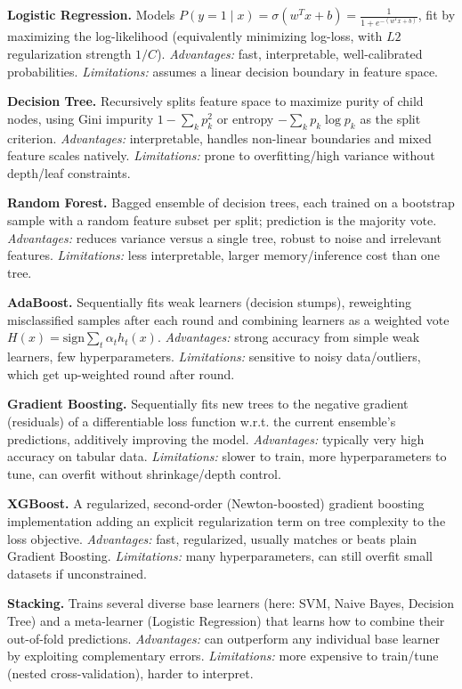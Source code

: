 \documentclass[12pt,a4paper]{article}
\begin{document}
\textbf{Logistic Regression.} Models \(P(y=1\mid x)=\sigma(w^Tx+b)=\tfrac{1}{1+e^{-(w^Tx+b)}}\), fit by
maximizing the log-likelihood (equivalently minimizing log-loss, with \(L2\) regularization
strength \(1/C\)). \emph{Advantages:} fast, interpretable, well-calibrated probabilities.
\emph{Limitations:} assumes a linear decision boundary in feature space.

\textbf{Decision Tree.} Recursively splits feature space to maximize purity of child nodes, using Gini
impurity \(1-\sum_k p_k^2\) or entropy \(-\sum_k p_k\log p_k\) as the split criterion.
\emph{Advantages:} interpretable, handles non-linear boundaries and mixed feature scales natively.
\emph{Limitations:} prone to overfitting/high variance without depth/leaf constraints.

\textbf{Random Forest.} Bagged ensemble of decision trees, each trained on a bootstrap sample with a
random feature subset per split; prediction is the majority vote. \emph{Advantages:} reduces variance
versus a single tree, robust to noise and irrelevant features. \emph{Limitations:} less interpretable,
larger memory/inference cost than one tree.

\textbf{AdaBoost.} Sequentially fits weak learners (decision stumps), reweighting misclassified samples
after each round and combining learners as a weighted vote \(H(x)=\text{sign}\sum_t \alpha_t
h_t(x)\). \emph{Advantages:} strong accuracy from simple weak learners, few hyperparameters.
\emph{Limitations:} sensitive to noisy data/outliers, which get up-weighted round after round.

\textbf{Gradient Boosting.} Sequentially fits new trees to the negative gradient (residuals) of a
differentiable loss function w.r.t. the current ensemble's predictions, additively improving the
model. \emph{Advantages:} typically very high accuracy on tabular data. \emph{Limitations:} slower to
train, more hyperparameters to tune, can overfit without shrinkage/depth control.

\textbf{XGBoost.} A regularized, second-order (Newton-boosted) gradient boosting implementation adding
an explicit regularization term on tree complexity to the loss objective. \emph{Advantages:} fast,
regularized, usually matches or beats plain Gradient Boosting. \emph{Limitations:} many
hyperparameters, can still overfit small datasets if unconstrained.

\textbf{Stacking.} Trains several diverse base learners (here: SVM, Naive Bayes, Decision Tree) and a
meta-learner (Logistic Regression) that learns how to combine their out-of-fold predictions.
\emph{Advantages:} can outperform any individual base learner by exploiting complementary errors.
\emph{Limitations:} more expensive to train/tune (nested cross-validation), harder to interpret.
\end{document}
